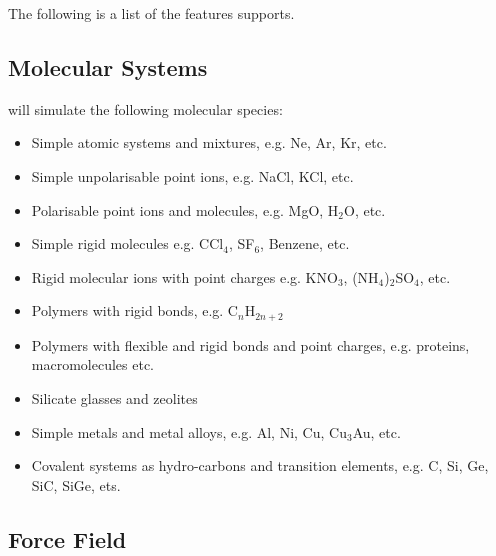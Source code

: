The following is a list of the features \D supports.

\subsection{Molecular Systems}

\D will simulate the following molecular species:

\begin{itemize}
\item Simple atomic systems and mixtures, e.g. Ne, Ar, Kr, etc.
\item Simple unpolarisable point ions, e.g. NaCl, KCl, etc.
\item Polarisable point ions and molecules, e.g. MgO, H$_{2}$O, etc.
\item Simple rigid molecules e.g. CCl$_{4}$, SF$_{6}$, Benzene, etc.
\item Rigid molecular ions with point charges e.g. KNO$_{3}$,
(NH$_{4}$)$_{2}$SO$_{4}$, etc.
\item Polymers with rigid bonds, e.g. C$_{n}$H$_{2n+2}$
\item Polymers with flexible and rigid bonds and point charges, e.g. proteins, macromolecules etc.
\item Silicate glasses and zeolites
\item Simple metals and metal alloys, e.g. Al, Ni, Cu, Cu$_{3}$Au, etc.
\item Covalent systems as hydro-carbons and transition elements, e.g. C, Si, Ge, SiC, SiGe, ets.
\end{itemize}

\subsection{Force Field}

